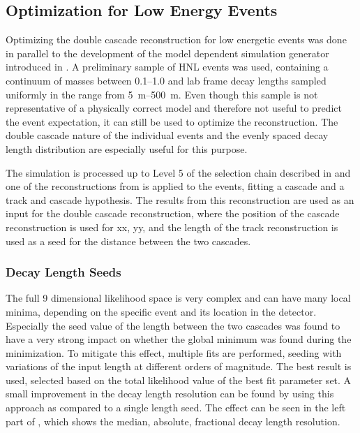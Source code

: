 \subsection{Optimization for Low Energy Events}

Optimizing the double cascade reconstruction for low energetic events was done in parallel to the development of the model dependent simulation generator introduced in . A preliminary sample of HNL events was used, containing a continuum of masses between \SIrange[range-phrase=~and~]{0.1}{1.0}{\gev} and lab frame decay lengths sampled uniformly in the range from \SIrange{5}{500}{\meter}. Even though this sample is not representative of a physically correct model and therefore not useful to predict the event expectation, it can still be used to optimize the reconstruction. The double cascade nature of the individual events and the evenly spaced decay length distribution are especially useful for this purpose.

The simulation is processed up to Level 5 of the selection chain described in  and one of the reconstructions from  is applied to the events, fitting a cascade and a track and cascade hypothesis. The results from this reconstruction are used as an input for the double cascade reconstruction, where the position of the cascade reconstruction is used for xx, yy, and the length of the track reconstruction is used as a seed for the distance between the two cascades.


\subsubsection{Decay Length Seeds}

The full 9 dimensional likelihood space is very complex and can have many local minima, depending on the specific event and its location in the detector. Especially the seed value of the length between the two cascades was found to have a very strong impact on whether the global minimum was found during the minimization. To mitigate this effect, multiple fits are performed, seeding with variations of the input length at different orders of magnitude. The best result is used, selected based on the total likelihood value of the best fit parameter set. A small improvement in the decay length resolution can be found by using this approach as compared to a single length seed. The effect can be seen in the left part of , which shows the median, absolute, fractional decay length resolution.

